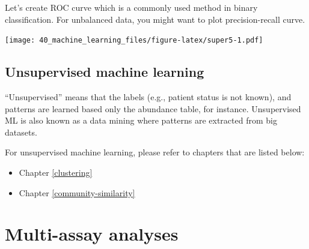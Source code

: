 \documentclass[
]{book}
\newenvironment{Shaded}{\begin{snugshade}}{\end{snugshade}}
\newcommand{\AttributeTok}[1]{\textcolor[rgb]{0.77,0.63,0.00}{#1}}
\newcommand{\CommentTok}[1]{\textcolor[rgb]{0.56,0.35,0.01}{\textit{#1}}}
\newcommand{\ConstantTok}[1]{\textcolor[rgb]{0.00,0.00,0.00}{#1}}
\newcommand{\FunctionTok}[1]{\textcolor[rgb]{0.00,0.00,0.00}{#1}}
\newcommand{\NormalTok}[1]{#1}
\newcommand{\OtherTok}[1]{\textcolor[rgb]{0.56,0.35,0.01}{#1}}
\newcommand{\SpecialCharTok}[1]{\textcolor[rgb]{0.00,0.00,0.00}{#1}}
\newcommand{\StringTok}[1]{\textcolor[rgb]{0.31,0.60,0.02}{#1}}
\providecommand{\tightlist}{%
  \setlength{\itemsep}{0pt}\setlength{\parskip}{0pt}}
\begin{document}
Let's create ROC curve which is a commonly used method in binary classification.
For unbalanced data, you might want to plot precision-recall curve.

\begin{Shaded}
\end{Shaded}

\texttt{[image: 40\_machine\_learning\_files/figure-latex/super5-1.pdf]}

\hypertarget{unsupervised-machine-learning}{%
\section{Unsupervised machine learning}\label{unsupervised-machine-learning}}

``Unsupervised'' means that the labels (e.g., patient status is not known),
and patterns are learned based only the abundance table, for instance.
Unsupervised ML is also known as a data mining where patterns are extracted
from big datasets.

For unsupervised machine learning, please refer to chapters that are listed below:

\begin{itemize}
\tightlist
\item
  Chapter \ref{clustering}
\item
  Chapter \ref{community-similarity}
\end{itemize}

\hypertarget{multi-assay-analyses}{%
\chapter{Multi-assay analyses}\label{multi-assay-analyses}}
\end{document}
